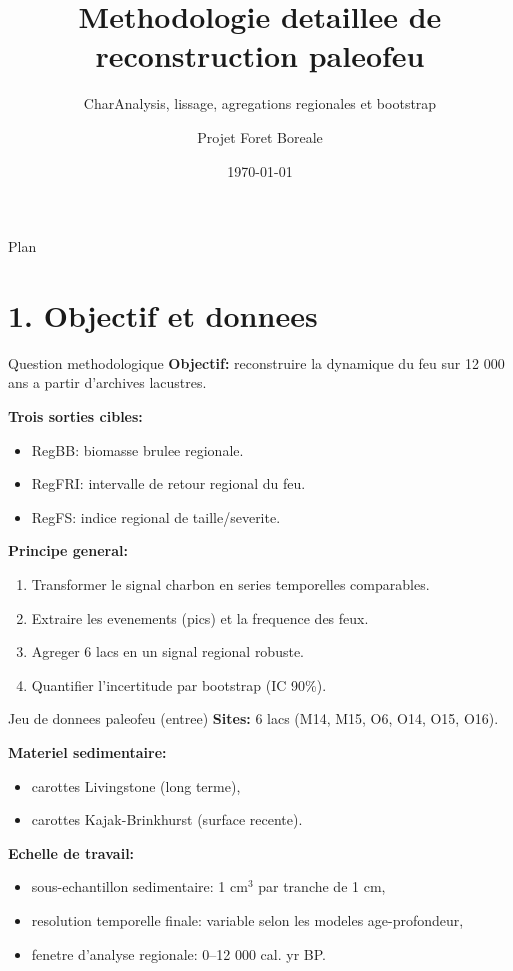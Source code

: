 \documentclass[aspectratio=169,11pt]{beamer}
\title{Methodologie detaillee de reconstruction paleofeu}
\subtitle{CharAnalysis, lissage, agregations regionales et bootstrap}
\author{Projet Foret Boreale}
\institute{Synthese technique basee sur l'article principal et ses references methodologiques}
\date{\today}
\begin{document}
\begin{frame}
  \titlepage
\end{frame}

\begin{frame}{Plan}
  \tableofcontents
\end{frame}

\section{1. Objectif et donnees}

\begin{frame}{Question methodologique}
\textbf{Objectif:} reconstruire la dynamique du feu sur 12 000 ans a partir d'archives lacustres.

\vspace{0.3cm}
\textbf{Trois sorties cibles:}
\begin{itemize}
  \item \alert{RegBB}: biomasse brulee regionale.
  \item \alert{RegFRI}: intervalle de retour regional du feu.
  \item \alert{RegFS}: indice regional de taille/severite.
\end{itemize}

\textbf{Principe general:}
\begin{enumerate}
  \item Transformer le signal charbon en series temporelles comparables.
  \item Extraire les evenements (pics) et la frequence des feux.
  \item Agreger 6 lacs en un signal regional robuste.
  \item Quantifier l'incertitude par bootstrap (IC 90\%).
\end{enumerate}
\end{frame}

\begin{frame}{Jeu de donnees paleofeu (entree)}
\textbf{Sites:} 6 lacs (M14, M15, O6, O14, O15, O16).

\textbf{Materiel sedimentaire:}
\begin{itemize}
  \item carottes Livingstone (long terme),
  \item carottes Kajak-Brinkhurst (surface recente).
\end{itemize}

\textbf{Echelle de travail:}
\begin{itemize}
  \item sous-echantillon sedimentaire: 1 cm$^3$ par tranche de 1 cm,
  \item resolution temporelle finale: variable selon les modeles age-profondeur,
  \item fenetre d'analyse regionale: 0--12 000 cal. yr BP.
\end{itemize}
\end{frame}
\end{document}
